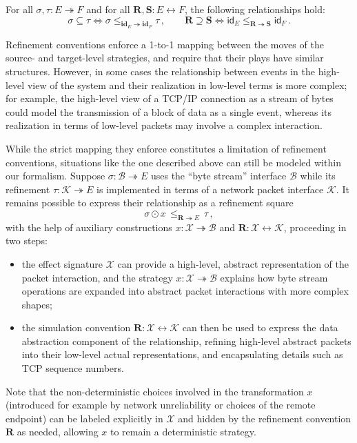 \documentclass[acmsmall,screen,review,nonacm]{acmart}
\newcommand{\kw}[1]{\ensuremath{ \mathsf{#1} }}
\newcommand{\idsc}{\mathbf{id}} %
\begin{document}
\begin{theorem}
For all $\sigma, \tau : E \twoheadrightarrow F$ and
for all $\mathbf{R}, \mathbf{S} : E \leftrightarrow F$,
the following relationships hold:
\[
  \sigma \subseteq \tau \Leftrightarrow
  \sigma \le_{\idsc_E \twoheadrightarrow \idsc_F} \tau
  \,,
  \qquad
  \mathbf{R} \supseteq \mathbf{S} \Leftrightarrow
  \kw{id}_E \le_{\mathbf{R} \twoheadrightarrow \mathbf{S}} \kw{id}_F
  \,.
\]
\end{theorem}

\begin{remark}%
Refinement conventions enforce a 1-to-1 mapping between
the moves of the source- and target-level strategies,
and require that their plays have similar structures.
However, in some cases
the relationship between events in the high-level view of the system
and their realization in low-level terms is more complex;
for example,
the high-level view of a TCP/IP connection as a stream of bytes
could model the transmission of a block of data as a single event,
whereas its realization in terms of low-level packets
may involve a complex interaction.

While the strict mapping they enforce
constitutes a limitation of refinement conventions,
situations like the one described above
can still be modeled within our formalism.
Suppose $\sigma : \mathcal{B} \twoheadrightarrow E$
uses the ``byte stream'' interface $\mathcal{B}$
while its refinement
$\tau : \mathcal{K} \twoheadrightarrow E$
is implemented in terms of
a network packet interface $\mathcal{K}$.
It remains possible to express their relationship
as a refinement square
\[
  \sigma \odot x \, \le_{\mathbf{R} \twoheadrightarrow E} \, \tau
  \,,
\]
with the help of auxiliary constructions
$x : \mathcal{X} \twoheadrightarrow \mathcal{B}$ and
$\mathbf{R} : \mathcal{X} \leftrightarrow \mathcal{K}$,
proceeding in two steps:
\begin{itemize}
  \item the effect signature $\mathcal{X}$ can provide
    a high-level, abstract representation of the packet interaction,
    and the strategy $x : \mathcal{X} \twoheadrightarrow \mathcal{B}$
    explains how byte stream operations are expanded into
    abstract packet interactions with more complex shapes;
  \item the simulation convention
    $\mathbf{R} : \mathcal{X} \leftrightarrow \mathcal{K}$
    can then be used to express the data abstraction component of
    the relationship, refining high-level abstract packets into
    their low-level actual representations,
    and encapsulating details such as TCP sequence numbers.
\end{itemize}
Note that the non-deterministic choices
involved in the transformation $x$
(introduced for example by network unreliability
or choices of the remote endpoint)
can be labeled explicitly in $\mathcal{X}$
and hidden by the refinement convention $\mathbf{R}$ as needed,
allowing $x$ to remain a deterministic strategy.
\end{remark}
\end{document}
